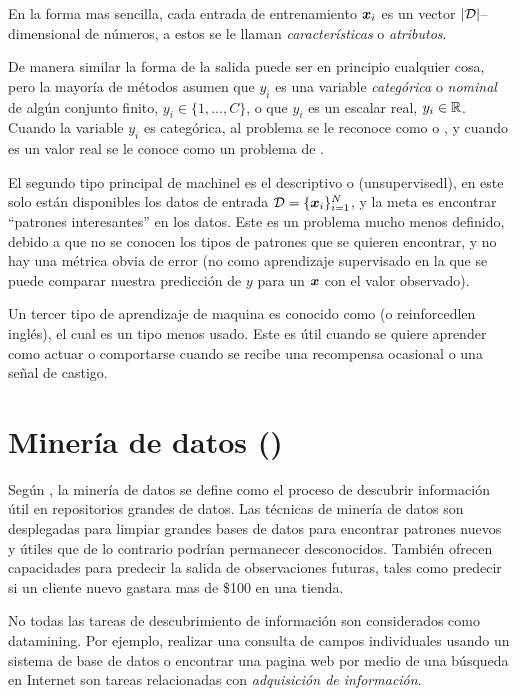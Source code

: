 En la forma mas sencilla, cada entrada de entrenamiento ${\bm{x}}_i$ es un vector $|\mathcal{D}|$--dimensional de números, a estos se le llaman \emph{características} o \emph{atributos}.

De manera similar la forma de la salida puede ser en principio cualquier cosa, pero la mayoría de métodos asumen que $y_i$ es una variable \emph{categórica} o \emph{nominal} de algún conjunto finito, $y_i \in \{1,\ldots,C\}$, o que $y_i$ es un escalar real, $y_i \in \mathbb{R}$. Cuando la variable $y_i$ es categórica, al problema se le reconoce como  o , y cuando es un valor real se le conoce como un problema de .

El segundo tipo principal de \gls{machinel} es el descriptivo o  (\gls{unsupervisedl}), en este solo están disponibles los datos de entrada $\mathcal{D} = \{{\bm{x}}_i\}_{i=1}^{N}$, y la meta es encontrar ``patrones interesantes'' en los datos. Este es un problema mucho menos definido, debido a que no se conocen los tipos de patrones que se quieren encontrar, y no hay una métrica obvia de error (no como aprendizaje supervisado en la que se puede comparar nuestra predicción de $y$ para un ${\bm{x}}$ con el valor observado).

Un tercer tipo de aprendizaje de maquina es conocido como  (o \gls{reinforcedl}en inglés), el cual es un tipo menos usado. Este es útil cuando se quiere aprender como actuar o comportarse cuando se recibe una recompensa ocasional o una señal de castigo.

\section{Minería de datos ()} \label{sec:datamining}
Según \cite{tan2005introduction}, la minería de datos se define como el proceso de descubrir información útil en repositorios grandes de datos. Las técnicas de minería de datos son desplegadas para limpiar grandes bases de datos para encontrar patrones nuevos y útiles que de lo contrario podrían permanecer desconocidos. También ofrecen capacidades para predecir la salida de observaciones futuras, tales como predecir si un cliente nuevo gastara mas de \$100 en una tienda.

No todas las tareas de descubrimiento de información son considerados como \gls{datamining}. Por ejemplo, realizar una consulta de campos individuales usando un sistema de base de datos o encontrar una pagina web por medio de una búsqueda en Internet son tareas relacionadas con \emph{adquisición de información}.

